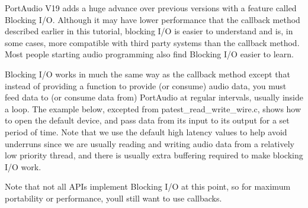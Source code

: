 Port\+Audio V19 adds a huge advance over previous versions with a feature called Blocking I/O. Although it may have lower performance that the callback method described earlier in this tutorial, blocking I/O is easier to understand and is, in some cases, more compatible with third party systems than the callback method. Most people starting audio programming also find Blocking I/O easier to learn.

Blocking I/O works in much the same way as the callback method except that instead of providing a function to provide (or consume) audio data, you must feed data to (or consume data from) Port\+Audio at regular intervals, usually inside a loop. The example below, excepted from patest\+\_\+read\+\_\+write\+\_\+wire.\+c, shows how to open the default device, and pass data from its input to its output for a set period of time. Note that we use the default high latency values to help avoid underruns since we are usually reading and writing audio data from a relatively low priority thread, and there is usually extra buffering required to make blocking I/O work.

Note that not all A\+PI\textquotesingle{}s implement Blocking I/O at this point, so for maximum portability or performance, you\textquotesingle{}ll still want to use callbacks.



